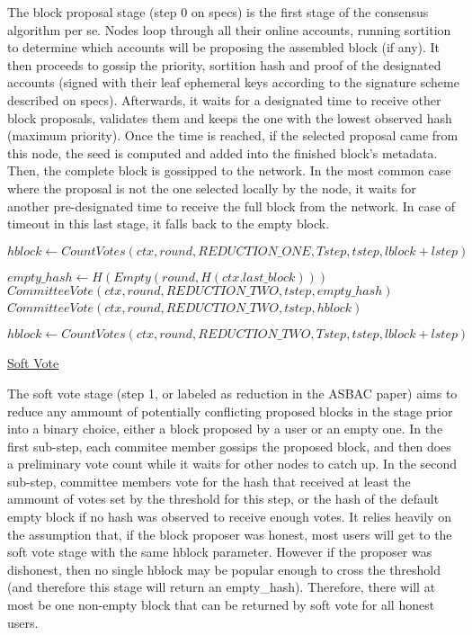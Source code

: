 \documentclass[10pt,a4paper]{article}
\begin{document}
The block proposal stage (step 0 on specs) is the first stage of the consensus algorithm per se. Nodes loop through all their online accounts, running sortition to determine which accounts will be proposing the assembled block (if any).
It then proceeds to gossip the priority, sortition hash and proof of the designated accounts (signed with their leaf ephemeral keys according to the signature scheme described on specs).
Afterwards, it waits for a designated time to receive other block proposals, validates them and keeps the one with the lowest observed hash (maximum priority).
Once the time is reached, if the selected proposal came from this node, the seed is computed and added into the finished block's metadata. Then, the complete block is gossipped to the network.
In the most common case where the proposal is not the one selected locally by the node, it waits for another pre-designated time to receive the full block from the network.
In case of timeout in this last stage, it falls back to the empty block.

\begin{algorithm}
    \begin{algorithmic}[H]
    
    \State $hblock \gets CountVotes(ctx, round, REDUCTION\_ONE, Tstep, tstep, lblock+lstep)$

    \State $empty\_hash \gets H(Empty(round, H(ctx.last\_block)))$ 
        \State $CommitteeVote(ctx, round, REDUCTION\_TWO, tstep, empty\_hash)$
    \Else
        {\State $CommitteeVote(ctx, round, REDUCTION\_TWO, tstep, hblock)$}
    \EndIf\

    \State $hblock \gets CountVotes(ctx, round, REDUCTION\_TWO, Tstep, tstep, lblock+lstep)$ 


    \EndFunction
    \end{algorithmic}
    \caption{\underline{Soft Vote}}
\end{algorithm}

The soft vote stage (step 1, or labeled as reduction in the ASBAC paper) aims to reduce any ammount of potentially conflicting proposed blocks in the stage prior into a binary choice, either a block proposed by a user or an empty one.
In the first sub-step, each commitee member gossips the proposed block, and then does a preliminary vote count while it waits for other nodes to catch up.
In the second sub-step, committee members vote for the hash that received at least the ammount of votes set by the threshold for this step, or the hash of the default empty block if no hash was observed to receive enough votes.
It relies heavily on the assumption that, if the block proposer was honest, most users will get to the soft vote stage with the same hblock parameter.
However if the proposer was dishonest, then no single hblock may be popular enough to cross the threshold (and therefore this stage will return an empty\_hash).
Therefore, there will at most be one non-empty block that can be returned by soft vote for all honest users.
\end{document}

